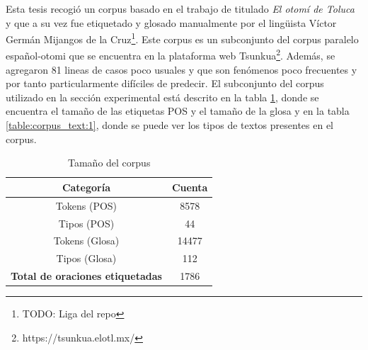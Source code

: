 \documentclass[letterpaper,12pt,oneside]{scrbook}
\theoremstyle{definition}
\begin{document}
	

	Esta tesis recogió un corpus basado en el trabajo de \citet{lastra1992otomi} titulado \emph{El otomí de Toluca} y que a su vez fue etiquetado y glosado manualmente por el lingüista Víctor Germán Mijangos de la Cruz\footnote{TODO: Liga del repo}. Este corpus es un subconjunto del corpus paralelo español-otomi que se encuentra en la plataforma web Tsunkua\footnote{https://tsunkua.elotl.mx/}. Además, se agregaron 81 lineas de casos poco usuales y que son fenómenos poco frecuentes y por tanto particularmente difíciles de predecir. El subconjunto del corpus utilizado en la sección experimental está descrito en la tabla \ref{table:corpus_length:1}, donde se encuentra el tamaño de las etiquetas POS y el tamaño de la glosa y en la tabla \ref{table:corpus_text:1}, donde se puede ver los tipos de textos presentes en el corpus.

	

	

	\begin{table}

		\centering

		\begin{tabular}{c | c}

			\textbf{Categoría} & \textbf{Cuenta} \\ \hline

			Tokens (POS) & 8578\\

			Tipos (POS) & 44\\

			Tokens (Glosa) & 14477\\

			Tipos (Glosa) & 112\\

			\textbf{Total de oraciones etiquetadas} & 1786 \\ 

		\end{tabular}

		\caption{Tamaño del corpus}

		\label{table:corpus_length:1}

	\end{table}
\end{document}

